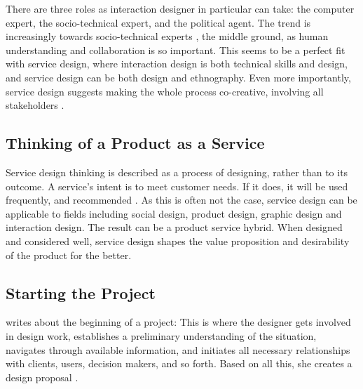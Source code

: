 There are three roles as interaction designer in particular can take: the computer expert, the socio-technical expert, and the political agent. The trend is increasingly towards socio-technical experts \citep{lowgren}, the middle ground, as human understanding and collaboration is so important. This seems to be a perfect fit with service design, where interaction design is both technical skills and design, and service design can be both design and ethnography. Even more importantly, service design suggests making the whole process co-creative, involving all stakeholders \citep{stickdorn}.

\subsection{Thinking of a Product as a Service}

Service design thinking is described as a process of designing, rather than to its outcome. A service's intent is to meet customer needs. If it does, it will be used frequently, and recommended \citep{stickdorn}. As this is often not the case, service design can be applicable to fields including social design, product design, graphic design and interaction design. The result can be a product service hybrid. When designed and considered well, service design shapes the value proposition and desirability of the product for the better.

\subsection{Starting the Project}

\cite{lowgren} writes about the beginning of a project: This is where the designer gets involved in design work, establishes a preliminary understanding of the situation, navigates through available information, and initiates all necessary relationships with clients, users, decision makers, and so forth. Based on all this, she creates a design proposal \citep{lowgren}.
